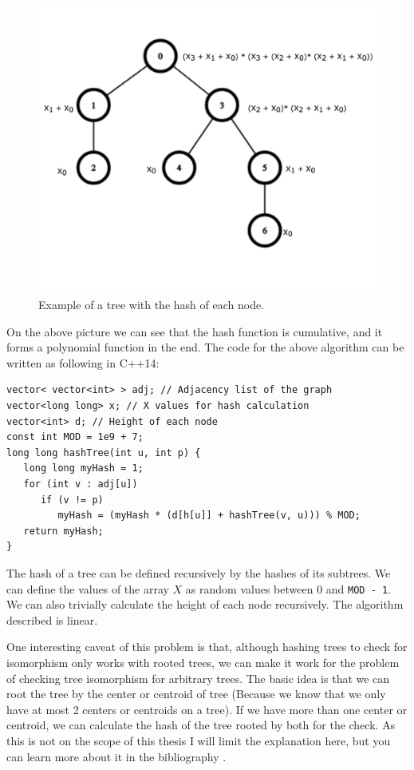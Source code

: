 \begin{figure}[h!]
  \centering
  \includegraphics[width=12.5cm]{figuras/treeIsomorphism.png}
  \caption{Example of a tree with the hash of each node. }
\end{figure}

On the above picture we can see that the hash function is cumulative, and it forms a polynomial function in the end. The code for the above algorithm can be written as following in C++14:

\begin{lstlisting}
vector< vector<int> > adj; // Adjacency list of the graph
vector<long long> x; // X values for hash calculation
vector<int> d; // Height of each node
const int MOD = 1e9 + 7;
long long hashTree(int u, int p) {
   long long myHash = 1;
   for (int v : adj[u])
      if (v != p)
         myHash = (myHash * (d[h[u]] + hashTree(v, u))) % MOD;
   return myHash;
}
\end{lstlisting}

The hash of a tree can be defined recursively by the hashes of its subtrees. We can define the values of the array \( X \) as random values between \( 0 \) and \texttt{MOD - 1}. We can also trivially calculate the height of each node recursively. The algorithm described is linear.

One interesting caveat of this problem is that, although hashing trees to check for isomorphism only works with rooted trees, we can make it work for the problem of checking tree isomorphism for arbitrary trees. The basic idea is that we can root the tree by the center or centroid of tree (Because we know that we only have at most 2 centers or centroids on a tree). If we have more than one center or centroid, we can calculate the hash of the tree rooted by both for the check. As this is not on the scope of this thesis I will limit the explanation here, but you can learn more about it in the bibliography \citep{Centroid}.

